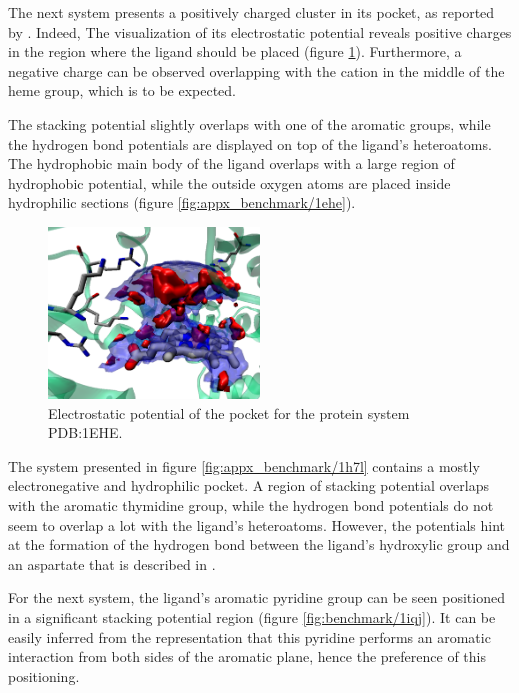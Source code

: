     The next system presents a positively charged cluster in its pocket, as reported by \cite{benchmark_positive_2001}. Indeed, The visualization of its electrostatic potential reveals positive charges in the region where the ligand should be placed (figure \ref{fig:benchmark/1ehe}). Furthermore, a negative charge can be observed overlapping with the cation in the middle of the heme group, which is to be expected.

    The stacking potential slightly overlaps with one of the aromatic groups, while the hydrogen bond potentials are displayed on top of the ligand's heteroatoms. The hydrophobic main body of the ligand overlaps with a large region of hydrophobic potential, while the outside oxygen atoms are placed inside hydrophilic sections (figure \ref{fig:appx_benchmark/1ehe}).

    \begin{figure}[H]
      \centering
      \includegraphics[width=0.5\textwidth]{figures/results/benchmark_prot/1ehe.png}
      \caption{\label{fig:benchmark/1ehe} Electrostatic potential of the pocket for the protein system PDB:1EHE.}
    \end{figure}

    The system presented in figure \ref{fig:appx_benchmark/1h7l} contains a mostly electronegative and hydrophilic pocket. A region of stacking potential overlaps with the aromatic thymidine group, while the hydrogen bond potentials do not seem to overlap a lot with the ligand's heteroatoms. However, the potentials hint at the formation of the hydrogen bond between the ligand's hydroxylic group and an aspartate that is described in \cite{benchmark_1h7l_2001}.

    For the next system, the ligand's aromatic pyridine group can be seen positioned in a significant stacking potential region (figure \ref{fig:benchmark/1iqj}). It can be easily inferred from the representation that this pyridine performs an aromatic interaction from both sides of the aromatic plane, hence the preference of this positioning.

